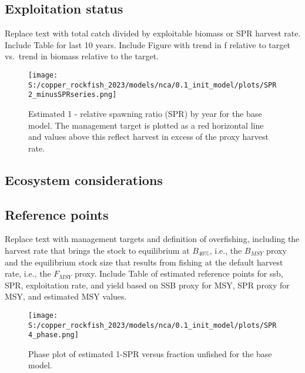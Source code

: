 \documentclass[11pt,
  english,
  letterpaper,
]{article}
\begin{document}
\clearpage

\hypertarget{exploitation-status}{%
\subsection*{Exploitation status}\label{exploitation-status}}

Replace text with total catch divided by exploitable biomass or SPR harvest rate. Include Table for last 10 years. Include Figure with trend in f relative to target vs.~trend in biomass relative to the target.



\begin{figure}
\centering
\texttt{[image: S:/copper\_rockfish\_2023/models/nca/0.1\_init\_model/plots/SPR2\_minusSPRseries.png]}
\caption{Estimated 1 - relative spawning ratio (SPR) by year for the base model. The management target is plotted as a red horizontal line and values above this reflect harvest in excess of the proxy harvest rate.\label{fig:es-1-spr}}
\end{figure}

\hypertarget{ecosystem-considerations}{%
\subsection*{Ecosystem considerations}\label{ecosystem-considerations}}

\hypertarget{reference-points}{%
\subsection*{Reference points}\label{reference-points}}

Replace text with management targets and definition of overfishing, including the harvest rate that brings the stock to equilibrium at \(B_{40\%}\), i.e., the \(B_{MSY}\) proxy and the equilibrium stock size that results from fishing at the default harvest rate, i.e., the \(F_{MSY}\) proxy. Include Table of estimated reference points for ssb, SPR, exploitation rate, and yield based on SSB proxy for MSY, SPR proxy for MSY, and estimated MSY values.

\begin{figure}
\centering
\texttt{[image: S:/copper\_rockfish\_2023/models/nca/0.1\_init\_model/plots/SPR4\_phase.png]}
\caption{Phase plot of estimated 1-SPR versus fraction unfished for the base model.\label{fig:es-phase}}
\end{figure}
\end{document}
